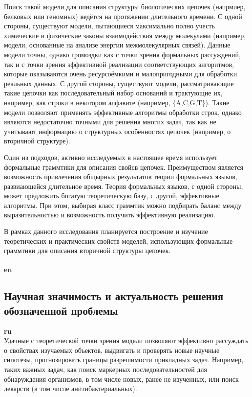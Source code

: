 ﻿\documentclass[12pt]{article}  %
\theoremstyle{remark}
\begin{document}
Поиск такой модели для описания структуры биологических цепочек (напрмиер, белковых или геномных) ведётся на протяжении длительного времени.
С одной стороны, существуют модели, пытающиеся максимально полно учесть химические и физические законы взаимодействия между молекулами (например, модели, основанные на анализе энергии межмолекулярных связей).
Данные модели точны, однако громоздки как с точки зрения формальных рассуждений, так и с точки зрения эффективной реализации соответствующих алгоритмов, которые оказываются очень ресурсоёмкими и малопригодными для обработки реальных данных.
С другой стороны, существуют модели, рассматривающие такие цепочки как последовательный набор оснований и трактующие их, например, как строки в некотором алфавите (например, \{A,C,G,T\}).
Такие модели позволяют применять эффективные алгоритмы обработки строк, однако являются недостаточно точными для решения многих задач, так как не учитывают информацию о структурных особенностях цепочек (например, о вторичной структуре).

Один из подходов, активно исследуемых в настоящее время использует формальные граммтики для описания свойсв цепочек.
Преимуществом является возможность привлечения общырных результатов теории формальных языков, развиающейся длительное время.
Теория формальных языков, с одной стороны, может предложить богатую теоретическую базу, с другой, эффективные алгоритмы.
При этом, выбирая класс граммтик можно подбирать баланс между выразительностью и возможность получить эффективную реализацию.

В рамках данного исследования планируется построение и изучение теоретических и практических свойств моделей, использующих формальные граммтики для описания вторичной структуры цепочек.
\\
\\
\textbf{en}\\



\subsection{Научная значимость и актуальность решения обозначенной проблемы}

\textbf{ru}\\
Удачные с теоретической точки зрения модели позволяют эффективно рассуждать о свойствах изучаемых объектов, выдвигать и проверять новые научные гипотезы, прогнозировать границы разрешимости прикладных задач. Например, таких важных задач, как поиск маркерных последовательностей для обнаруждения организмов, в том числе новых, ранее не изученных, или поиск лекарств (в том числе анитибактериальных).
\end{document}
